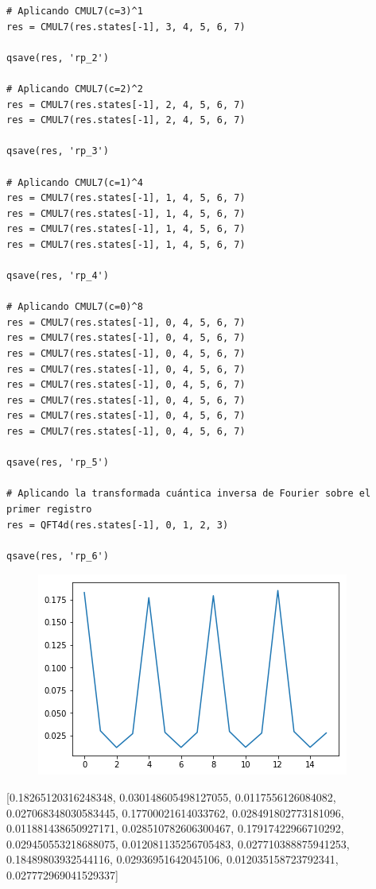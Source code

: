 \begin{verbatim}
# Aplicando CMUL7(c=3)^1
res = CMUL7(res.states[-1], 3, 4, 5, 6, 7)

qsave(res, 'rp_2')

# Aplicando CMUL7(c=2)^2
res = CMUL7(res.states[-1], 2, 4, 5, 6, 7)
res = CMUL7(res.states[-1], 2, 4, 5, 6, 7)

qsave(res, 'rp_3')

# Aplicando CMUL7(c=1)^4
res = CMUL7(res.states[-1], 1, 4, 5, 6, 7)
res = CMUL7(res.states[-1], 1, 4, 5, 6, 7)
res = CMUL7(res.states[-1], 1, 4, 5, 6, 7)
res = CMUL7(res.states[-1], 1, 4, 5, 6, 7)

qsave(res, 'rp_4')

# Aplicando CMUL7(c=0)^8
res = CMUL7(res.states[-1], 0, 4, 5, 6, 7)
res = CMUL7(res.states[-1], 0, 4, 5, 6, 7)
res = CMUL7(res.states[-1], 0, 4, 5, 6, 7)
res = CMUL7(res.states[-1], 0, 4, 5, 6, 7)
res = CMUL7(res.states[-1], 0, 4, 5, 6, 7)
res = CMUL7(res.states[-1], 0, 4, 5, 6, 7)
res = CMUL7(res.states[-1], 0, 4, 5, 6, 7)
res = CMUL7(res.states[-1], 0, 4, 5, 6, 7)

qsave(res, 'rp_5')

# Aplicando la transformada cuántica inversa de Fourier sobre el primer registro
res = QFT4d(res.states[-1], 0, 1, 2, 3)

qsave(res, 'rp_6')

\end{verbatim}

\begin{figure}[H]
\centering \includegraphics[width=0.9\linewidth]{img/shorlossless.png}
\caption{}
\end{figure}

[0.18265120316248348,
 0.030148605498127055,
 0.0117556126084082,
 0.027068348030583445,
 0.17700021614033762,
 0.028491802773181096,
 0.011881438650927171,
 0.028510782606300467,
 0.17917422966710292,
 0.029450553218688075,
 0.012081135256705483,
 0.027710388875941253,
 0.18489803932544116,
 0.02936951642045106,
 0.012035158723792341,
 0.027772969041529337]

